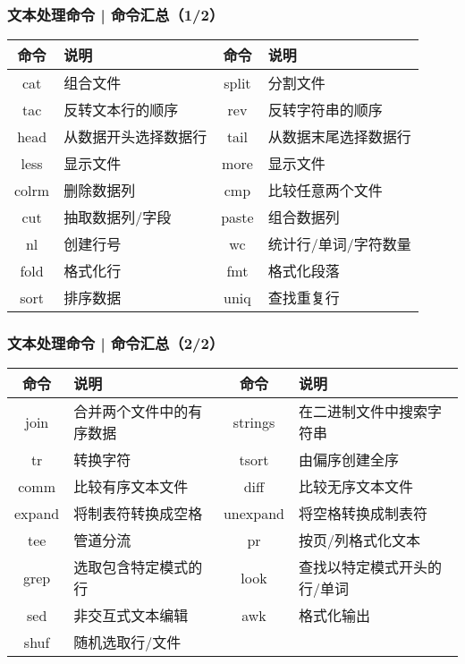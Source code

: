 \begin{frame}
  \frametitle{文本处理命令 | 命令汇总（1/2）}
  \begin{table}
    \centering
    \begin{tabularx}{\textwidth}{cX|cX}
      \hline
      \rowcolor{blue!50}命令 & 说明 & 命令 & 说明\\
      \hline
      cat & 组合文件 & split & 分割文件\\
      tac & 反转文本行的顺序 & rev & 反转字符串的顺序\\
      head & 从数据开头选择数据行 & tail & 从数据末尾选择数据行\\
      less & 显示文件 & more & 显示文件\\
      colrm & 删除数据列 & cmp & 比较任意两个文件\\
      cut & 抽取数据列/字段 & paste & 组合数据列\\
      nl & 创建行号 & wc & 统计行/单词/字符数量\\
      fold & 格式化行 & fmt & 格式化段落\\
      sort & 排序数据 & uniq & 查找重复行\\
      \hline
    \end{tabularx}
  \end{table}
\end{frame}

\begin{frame}
  \frametitle{文本处理命令 | 命令汇总（2/2）}
  \begin{table}
    \centering
    \begin{tabularx}{\textwidth}{cX|cX}
      \hline
      \rowcolor{blue!50}命令 & 说明 & 命令 & 说明\\
      \hline
      join & 合并两个文件中的有序数据 & strings & 在二进制文件中搜索字符串\\
      tr & 转换字符 & tsort & 由偏序创建全序\\
      comm & 比较有序文本文件 & diff & 比较无序文本文件\\
      expand & 将制表符转换成空格 & unexpand & 将空格转换成制表符\\
      tee & 管道分流 & pr & 按页/列格式化文本\\
      grep & 选取包含特定模式的行 & look & 查找以特定模式开头的行/单词\\
      sed & 非交互式文本编辑 & awk & 格式化输出\\
      shuf & 随机选取行/文件 & & \\
      \hline
    \end{tabularx}
  \end{table}
\end{frame}

